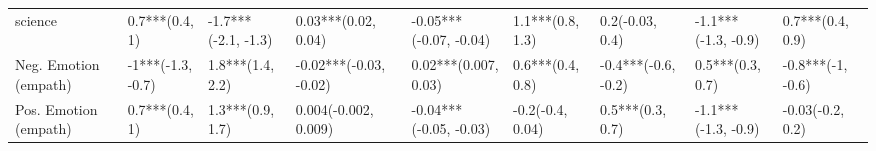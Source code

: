 \begin{tabular}{lllllllll}
science               &       0.7***(0.4, 1) &  -1.7***(-2.1, -1.3) &      0.03***(0.02, 0.04) &  -0.05***(-0.07, -0.04) &     1.1***(0.8, 1.3) &      0.2(-0.03, 0.4) &  -1.1***(-1.3, -0.9) &     0.7***(0.4, 0.9) \\
Neg. Emotion (empath) &    -1***(-1.3, -0.7) &     1.8***(1.4, 2.2) &   -0.02***(-0.03, -0.02) &    0.02***(0.007, 0.03) &     0.6***(0.4, 0.8) &  -0.4***(-0.6, -0.2) &     0.5***(0.3, 0.7) &    -0.8***(-1, -0.6) \\
Pos. Emotion (empath) &       0.7***(0.4, 1) &     1.3***(0.9, 1.7) &     0.004(-0.002, 0.009) &  -0.04***(-0.05, -0.03) &     -0.2(-0.4, 0.04) &     0.5***(0.3, 0.7) &  -1.1***(-1.3, -0.9) &     -0.03(-0.2, 0.2) \\
\bottomrule
\end{tabular}
